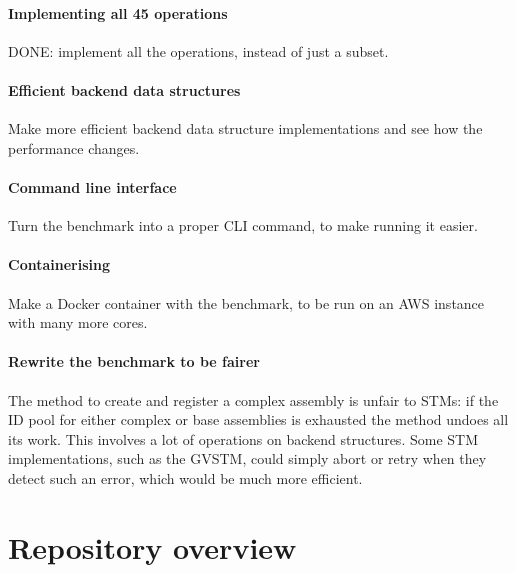 \documentclass[12pt,a4paper,oneside,openright]{report}
\newcommand{\mycaption}[2]{\caption[#1]{#1 #2}}
\begin{document}
\paragraph{Implementing all 45 operations}
DONE: implement all the operations, instead of just a subset.

\paragraph{Efficient backend data structures}

Make more efficient backend data structure implementations and see how
the performance changes.

\paragraph{Command line interface}

Turn the benchmark into a proper CLI command, to make running it
easier.

\paragraph{Containerising}
Make a Docker container with the benchmark, to be run on an AWS
instance with many more cores.

\paragraph{Rewrite the benchmark to be fairer}
The method to create and register a complex assembly is unfair to
STMs: if the ID pool for either complex or base assemblies is
exhausted the method undoes all its work. This involves a lot of
operations on backend structures. Some STM implementations, such as
the GVSTM, could simply abort or retry when they detect such an error,
which would be much more efficient.

\section{Repository overview}
\label{sec:impl:repository-overview}


\end{document}

